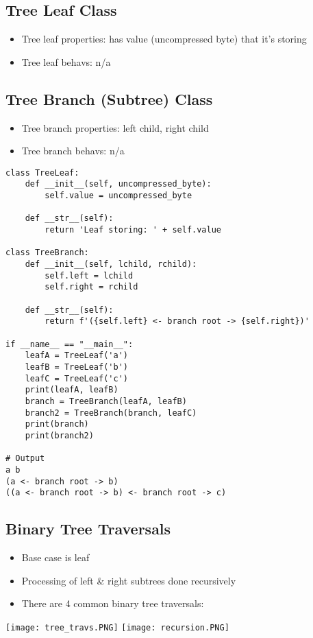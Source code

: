 \documentclass{article}
\begin{document}
\begin{multicols}{2}
\subsection{Tree Leaf Class}
        \begin{itemize}
            \item Tree leaf properties: has value (uncompressed byte) that it's storing
            \item Tree leaf behavs: n/a
        \end{itemize}

\subsection{Tree Branch (Subtree) Class}
    \begin{itemize}
        \item Tree branch properties: left child, right child
        \item Tree branch behavs: n/a
    \end{itemize}
\end{multicols}
\vspace{-2em}
\begin{lstlisting}
class TreeLeaf:
    def __init__(self, uncompressed_byte):
        self.value = uncompressed_byte
    
    def __str__(self):
        return 'Leaf storing: ' + self.value

class TreeBranch:
    def __init__(self, lchild, rchild):
        self.left = lchild
        self.right = rchild
    
    def __str__(self):
        return f'({self.left} <- branch root -> {self.right})'

if __name__ == "__main__":
    leafA = TreeLeaf('a')
    leafB = TreeLeaf('b')
    leafC = TreeLeaf('c')
    print(leafA, leafB)
    branch = TreeBranch(leafA, leafB)
    branch2 = TreeBranch(branch, leafC)
    print(branch)
    print(branch2)

# Output
a b
(a <- branch root -> b)
((a <- branch root -> b) <- branch root -> c)
\end{lstlisting}

\subsection{Binary Tree Traversals}
    \begin{itemize}
        \item Base case is leaf
        \item Processing of left \& right subtrees done recursively
        \item There are 4 common binary tree traversals:
    \end{itemize}
\vspace{-1em}
\begin{center}
    \texttt{[image: tree\_travs.PNG]}
    \texttt{[image: recursion.PNG]}
\end{center}
\end{document}
